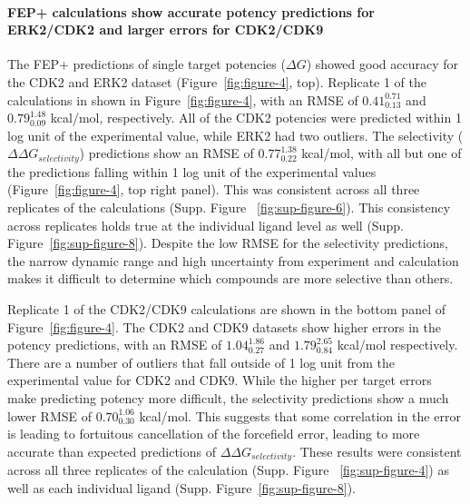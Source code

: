 \documentclass[9pt,lineno]{elife-modified} %
\begin{document}
\paragraph{FEP+ calculations show accurate potency predictions for ERK2/CDK2 and larger errors for CDK2/CDK9}
The FEP+ predictions of single target potencies ($\Delta G$) showed good accuracy for the CDK2 and ERK2 dataset (Figure~\ref{fig:figure-4}, top). Replicate 1 of the calculations in shown in Figure~\ref{fig:figure-4}, with an RMSE of $0.41^{0.71}_{0.13}$ and $0.79^{1.48}_{0.09}$ kcal/mol, respectively. All of the CDK2 potencies were predicted within 1 log unit of the experimental value, while ERK2 had two outliers. The selectivity ($\Delta \Delta G_{selectivity}$) predictions show an RMSE of $0.77^{1.38}_{0.22}$ kcal/mol, with all but one of the predictions falling within 1 log unit of the experimental values (Figure~\ref{fig:figure-4}, top right panel). This was consistent across all three replicates of the calculations (Supp. Figure ~\ref{fig:sup-figure-6}). This consistency across replicates holds true at the individual ligand level as well (Supp. Figure~\ref{fig:sup-figure-8}). Despite the low RMSE for the selectivity predictions, the narrow dynamic range and high uncertainty from experiment and calculation makes it difficult to determine which compounds are more selective than others. 

Replicate 1 of the CDK2/CDK9 calculations are shown in the bottom panel of Figure~\ref{fig:figure-4}. The CDK2 and CDK9 datasets show higher errors in the potency predictions, with an RMSE of $1.04^{1.86}_{0.27}$ and $1.79^{2.65}_{0.84}$ kcal/mol respectively. There are a number of outliers that fall outside of 1 log unit from the experimental value for CDK2 and CDK9. While the higher per target errors make predicting potency more difficult, the selectivity predictions show a much lower RMSE of $0.70^{1.06}_{0.30}$ kcal/mol. This suggests that some correlation in the error is leading to fortuitous cancellation of the forcefield error, leading to more accurate than expected predictions of $\Delta \Delta G_{selectivity}$. These results were consistent across all three replicates of the calculation (Supp. Figure ~\ref{fig:sup-figure-4}) as well as each individual ligand (Supp. Figure~\ref{fig:sup-figure-8}). 
\end{document}
